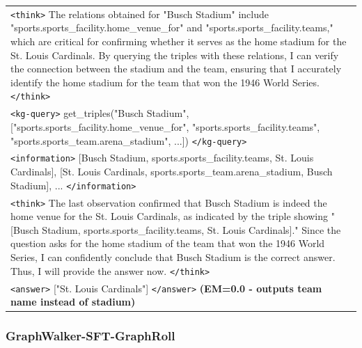 {\begin{longtable}{>{\raggedright\arraybackslash}p{}}
\rowcolor{blue!10}
\texttt{<think>} The relations obtained for "Busch Stadium" include "sports.sports\_facility.home\_venue\_for" and "sports.sports\_facility.teams," which are critical for confirming whether it serves as the home stadium for the St. Louis Cardinals. By querying the triples with these relations, I can verify the connection between the stadium and the team, ensuring that I accurately identify the home stadium for the team that won the 1946 World Series. \texttt{</think>} \\
\rowcolor{green!10}
\texttt{<kg-query>} get\_triples("Busch Stadium", ["sports.sports\_facility.home\_venue\_for", "sports.sports\_facility.teams", "sports.sports\_team.arena\_stadium", ...]) \texttt{</kg-query>} \\
\rowcolor{yellow!10}
\texttt{<information>} [Busch Stadium, sports.sports\_facility.teams, St. Louis Cardinals], [St. Louis Cardinals, sports.sports\_team.arena\_stadium, Busch Stadium], ... \texttt{</information>} \\
\rowcolor{blue!10}
\texttt{<think>} The last observation confirmed that Busch Stadium is indeed the home venue for the St. Louis Cardinals, as indicated by the triple showing "[Busch Stadium, sports.sports\_facility.teams, St. Louis Cardinals]." Since the question asks for the home stadium of the team that won the 1946 World Series, I can confidently conclude that Busch Stadium is the correct answer. Thus, I will provide the answer now. \texttt{</think>} \\
\rowcolor{red!10}
\texttt{<answer>} ["St. Louis Cardinals"] \texttt{</answer>} \textbf{(EM=0.0 - outputs team name instead of stadium)} \\
\bottomrule
\end{longtable}
}


\newpage
\subsubsection{GraphWalker-SFT-GraphRoll}

